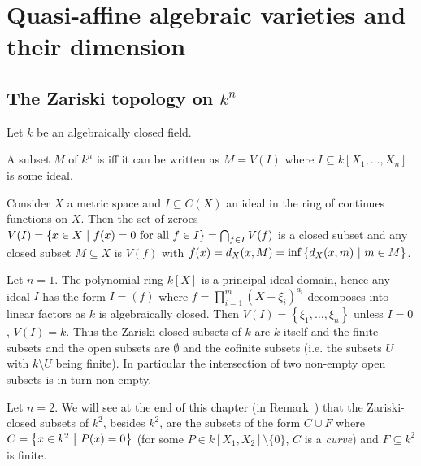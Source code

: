 \documentclass[a4paper,parskip=half,numbers=enddot, DIV=12]{scrreprt}
\begin{document}
\chapter{Quasi-affine algebraic varieties and their dimension}

\section{The Zariski topology on \texorpdfstring{$k^n$}{kn}} \label{sec:ZariskiOnk^n}
	Let $k$ be an algebraically closed field.
	\begin{defi}
		A subset $M$ of $k^n$ is  iff it can be written as $M=V(I)$ where $I\subseteq k[X_1,\ldots,X_n]$ is some ideal.
	\end{defi}
	\begin{example}
		Consider $X$ a metric space and $I\subseteq C(X)$ an ideal in the ring of continues functions on $X$. Then the set of zeroes $V(I) = \left\{ x\in X\ \middle|\  f(x) = 0 \text{ for all } f\in I\right\} = \bigcap_{f\in I} V(f)$ is a closed subset and any closed subset $M\subseteq X$ is $V(f)$ with $f(x) = d_X(x,M) = \inf\left\{d_X(x,m)\ \middle|\  m\in M\right\}$.
	\end{example}
	\begin{example}
		Let $n=1$. The polynomial ring $k[X]$ is a principal ideal domain, hence any ideal $I$ has the form $I=(f)$ where $f=\prod_{i=1}^m (X-\xi_i)^{a_i}$ decomposes into linear factors as $k$ is algebraically closed. Then $V(I) = \left\{\xi_1,\ldots, \xi_n\right\}$ unless $I=0$, $V(I) = k$. Thus the Zariski-closed subsets of $k$ are $k$ itself and the finite subsets and the open subsets are $\emptyset$ and the cofinite subsets (i.e. the subsets $U$ with $k\setminus U$ being finite). In particular the intersection of two non-empty open subsets is in turn non-empty.
	\end{example}
	\begin{example}
		Let $n=2$. We will see at the end of this chapter (in Remark~) that the Zariski-closed subsets of $k^2$, besides $k^2$, are the subsets of the form $C\cup F$ where $C=\left\{x\in k^2\ \middle|\  P(x) = 0\right\}$ (for some $P\in k[X_1,X_2]\setminus\{0\}$, $C$ is a \emph{curve}) and $F\subseteq k^2$ is finite.
	\end{example}
\end{document}
